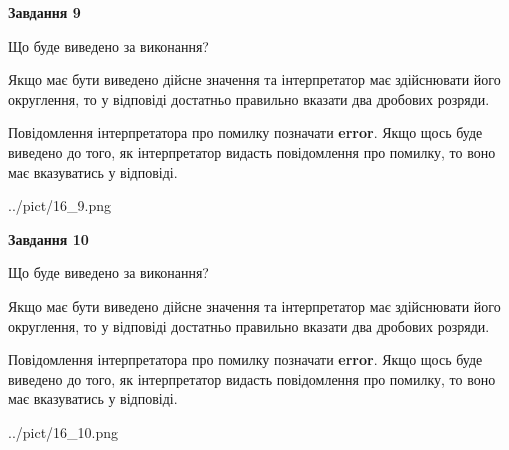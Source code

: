 \documentclass[12pt, ukrainian]{article}
\begin{document}
{\begin {Large}
{\begin {center}\textbf{Завдання 9}\end {center}}\par
Що буде виведено за виконання? \par

Якщо має бути виведено дійсне значення та інтерпретатор має здійснювати його округлення, 
то у відповіді достатньо правильно вказати два дробових розряди.

Повідомлення інтерпретатора про помилку позначати \textbf{error}.
Якщо щось буде виведено до того, як інтерпретатор видасть повідомлення про помилку, 
то воно має вказуватись у відповіді. \par

\begin{center}
	{../pict/16_9.png}
\end{center}
\newpage

{\begin {center}\textbf{Завдання 10}\end {center}}\par
Що буде виведено за виконання? \par

Якщо має бути виведено дійсне значення та інтерпретатор має здійснювати його округлення, 
то у відповіді достатньо правильно вказати два дробових розряди.

Повідомлення інтерпретатора про помилку позначати \textbf{error}.
Якщо щось буде виведено до того, як інтерпретатор видасть повідомлення про помилку, 
то воно має вказуватись у відповіді. \par

\begin{center}
	{../pict/16_10.png}
\end{center}
\newpage

\end {Large}}
\end{document}
